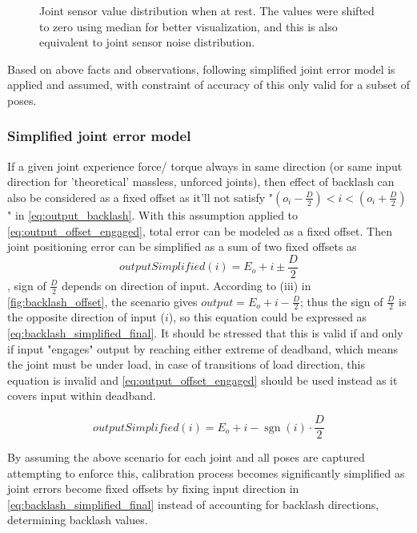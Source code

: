 \documentclass[english, printversion, nomenclature, notitle]{tuvisionthesis} %
\DeclareMathOperator{\sgn}{sgn}
\begin{document}
\begin{center}
	\begin{figure}
		\def\svgwidth{\linewidth}
		
		\caption[Joint sensor angle value distribution when at rest.]{Joint sensor value distribution when at rest. The values were shifted to zero using median for better visualization, and this is also equivalent to joint sensor noise distribution.}
		\label{fig:joint_sensor_noise}
	\end{figure}
\end{center}

Based on above facts and observations, following simplified joint error model is applied and assumed, with constraint of accuracy of this only valid for a subset of poses.

\subsubsection{Simplified joint error model}
\label{subsubsec:simplified_joint_error_model}
If a given joint experience force/ torque always in same direction (or same input direction for 'theoretical' massless, unforced joints), then effect of backlash can also be considered as a fixed offset as it'll not satisfy "$(o_i - \frac{D}{2}) < i < (o_i + \frac{D}{2})$" in \cref{eq:output_backlash}. With this assumption applied to \cref{eq:output_offset_engaged}, total error can be modeled as a fixed offset. Then joint positioning error can be simplified as a sum of two fixed offsets as \[outputSimplified(i) = E_o + i \pm \frac{D}{2}\], sign of $\frac{D}{2}$ depends on direction of input. According to (iii) in \cref{fig:backlash_offset}, the scenario gives $output = E_o + i - \frac{D}{2}$; thus the sign of $\frac{D}{2}$ is the opposite direction of input ($i$), so this equation could be expressed as \cref{eq:backlash_simplified_final}. It should be stressed that this is valid if and only if input "engages" output by reaching either extreme of deadband, which means the joint must be under load, in case of transitions of load direction, this equation is invalid and \cref{eq:output_offset_engaged} should be used instead as it covers input within deadband.

\begin{equation}
outputSimplified(i) = E_o + i -\sgn(i)\cdot\frac{D}{2}
\label{eq:backlash_simplified_final}
\end{equation}

By assuming the above scenario for each joint and all poses are captured attempting to enforce this, calibration process becomes significantly simplified as joint errors become fixed offsets by fixing input direction in \cref{eq:backlash_simplified_final} instead of accounting for backlash directions, determining backlash values.
\end{document}
